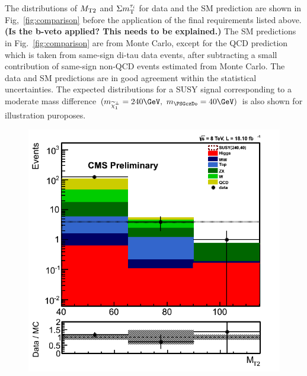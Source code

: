 The distributions of ${M_{\rm T2}}$ and $\Sigma m_{\rm T}^{\tau_i}$ for data and the SM prediction
are shown in Fig,~\ref{fig:comparison} before the application of the final
requirements listed above.
{\bf (Is the b-veto applied?  This needs to be explained.)}
The SM predictions in Fig.~\ref{fig:comparison} 
are from Monte Carlo, except for the
QCD prediction which is taken from same-sign di-tau data events,
after subtracting a small contribution of same-sign non-QCD events estimated from Monte Carlo.
The data and SM predictions are in good agreement within the statistical uncertainties.
The expected distributions for a SUSY signal 
corresponding to a moderate mass difference $(m_{\chione}=240\GeV,~m_{\PSGczDo}=40\GeV)$
is also shown for illustration puroposes.
\begin{figure}[!Hhtb]
\centering
\includegraphics[angle=0,scale=0.35]{TauTauFigs/mt2.png}

\end{figure}
